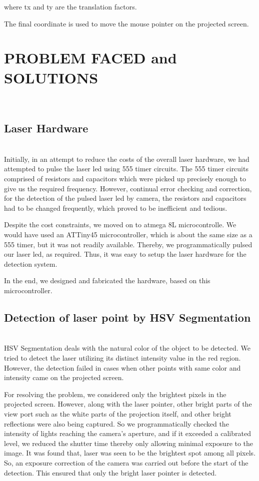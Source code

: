 \documentclass[12pt, a4paper]{article}
\begin{document}
{where tx and ty are the translation factors.

The final coordinate is used to move the mouse pointer on the projected screen. 
\newpage
\section{PROBLEM FACED and SOLUTIONS}
~\\
\subsection{Laser Hardware}
~\\
Initially, in an attempt to reduce the costs of the overall laser hardware, we had attempted to pulse the laser led using 555 timer circuits. The 555 timer circuits comprised of resistors and capacitors which were picked up precisely enough to give us the required frequency. However, continual error checking and correction, for the detection of the pulsed laser led by camera, the resistors and capacitors had to be changed frequently, which proved to be inefficient and tedious.


Despite the cost constraints, we moved on to atmega 8L microcontrolle. We would have used an ATTiny45 microcontroller, which is about the same size as a 555 timer, but it was not readily available. Thereby, we programmatically pulsed our laser led, as required. Thus, it was easy to setup the laser hardware for the detection system.

In the end, we designed and fabricated the hardware, based on this microcontroller.


\subsection{Detection of laser point by HSV Segmentation}
~\\
HSV Segmentation deals with the natural color of the object to be detected. We tried to detect the laser utilizing its distinct intensity value in the red region. However, the detection failed in cases when other points with same color and intensity came on the projected screen.

For resolving the problem, we considered only the brightest pixels in the projected screen. However, along with the laser pointer, other bright parts of the view port such as the white parts of the projection itself, and other bright reflections were also being captured. So we programmatically checked the intensity of lights reaching the camera's aperture, and if it exceeded a calibrated level, we reduced the shutter time thereby only allowing minimal exposure to the image. It was found that, laser was seen to be the brightest spot among all pixels. So, an exposure correction of the camera was carried out before the start of the detection. This ensured that only the bright laser pointer is detected.
\newpage
}
\end{document}
